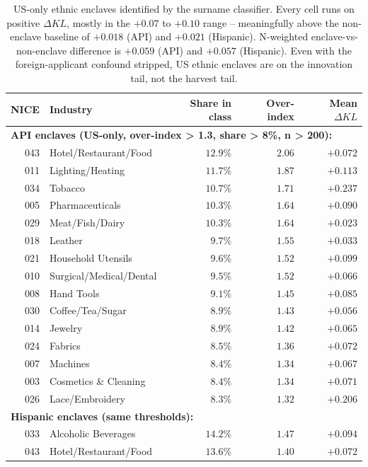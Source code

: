 \documentclass[11pt]{article}
\begin{document}
\begin{table}[h]
\centering
\small
\begin{tabular}{rlrrr}
\toprule
NICE & Industry & Share in class & Over-index & Mean $\Delta KL$ \\
\midrule
\multicolumn{5}{l}{\textbf{API enclaves (US-only, over-index > 1.3, share > 8\%, n > 200):}} \\
043 & Hotel/Restaurant/Food   & $12.9\%$ & $2.06$ & $+0.072$ \\
011 & Lighting/Heating        & $11.7\%$ & $1.87$ & $+0.113$ \\
034 & Tobacco                 & $10.7\%$ & $1.71$ & $+0.237$ \\
005 & Pharmaceuticals         & $10.3\%$ & $1.64$ & $+0.090$ \\
029 & Meat/Fish/Dairy         & $10.3\%$ & $1.64$ & $+0.023$ \\
018 & Leather                 &  $9.7\%$ & $1.55$ & $+0.033$ \\
021 & Household Utensils      &  $9.6\%$ & $1.52$ & $+0.099$ \\
010 & Surgical/Medical/Dental &  $9.5\%$ & $1.52$ & $+0.066$ \\
008 & Hand Tools              &  $9.1\%$ & $1.45$ & $+0.085$ \\
030 & Coffee/Tea/Sugar        &  $8.9\%$ & $1.43$ & $+0.056$ \\
014 & Jewelry                 &  $8.9\%$ & $1.42$ & $+0.065$ \\
024 & Fabrics                 &  $8.5\%$ & $1.36$ & $+0.072$ \\
007 & Machines                &  $8.4\%$ & $1.34$ & $+0.067$ \\
003 & Cosmetics \& Cleaning   &  $8.4\%$ & $1.34$ & $+0.071$ \\
026 & Lace/Embroidery         &  $8.3\%$ & $1.32$ & $+0.206$ \\
\midrule
\multicolumn{5}{l}{\textbf{Hispanic enclaves (same thresholds):}} \\
033 & Alcoholic Beverages     & $14.2\%$ & $1.47$ & $+0.094$ \\
043 & Hotel/Restaurant/Food   & $13.6\%$ & $1.40$ & $+0.072$ \\
\bottomrule
\end{tabular}
\caption{US-only ethnic enclaves identified by the surname
classifier. Every cell runs on positive $\Delta KL$, mostly in the
$+0.07$ to $+0.10$ range -- meaningfully above the non-enclave
baseline of $+0.018$ (API) and $+0.021$ (Hispanic). N-weighted
enclave-vs-non-enclave difference is $+0.059$ (API) and $+0.057$
(Hispanic). Even with the foreign-applicant confound stripped, US
ethnic enclaves are on the innovation tail, not the harvest tail.}
\end{table}
\end{document}
